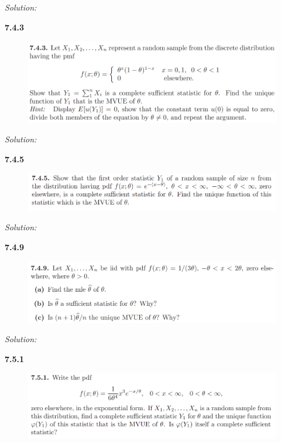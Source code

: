 \documentclass{book}
\theoremstyle{definition}
\begin{document}
\noindent \textit{Solution:}
\newpage





\noindent\textbf{7.4.3}
\begin{figure}[!htb]
	\centering
	\includegraphics[scale=1]{743}
\end{figure}



\noindent \textit{Solution:}
\newpage





\noindent\textbf{7.4.5}
\begin{figure}[!htb]
	\centering
	\includegraphics[scale=1]{745}
\end{figure}



\noindent \textit{Solution:}
\newpage





\noindent\textbf{7.4.9}
\begin{figure}[!htb]
	\centering
	\includegraphics[scale=1]{749}
\end{figure}



\noindent \textit{Solution:}
\newpage






\noindent\textbf{7.5.1}
\begin{figure}[!htb]
	\centering
	\includegraphics[scale=1]{751}
\end{figure}
\end{document}
